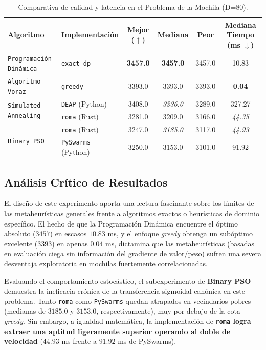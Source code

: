 \documentclass[12pt,a4paper,twoside,openright]{book}
\begin{document}
\begin{table}[htbp]
\centering
\small
\begin{tabular}{l l ccc c}
\toprule
\textbf{Algoritmo} & \textbf{Implementación} & \textbf{Mejor ($\uparrow$)} & \textbf{Mediana} & \textbf{Peor} & \textbf{Mediana Tiempo (ms $\downarrow$)} \\
\midrule
\texttt{Programación Dinámica}& \texttt{exact\_dp} & \textbf{3457.0} & \textbf{3457.0} & 3457.0 & 10.83 \\
\texttt{Algoritmo Voraz} & \texttt{greedy} & 3393.0 & 3393.0 & 3393.0 & \textbf{0.04} \\
\midrule
\multirow{2}{*}{\texttt{Simulated Annealing}} 
& \texttt{DEAP} (Python) & 3408.0 & \textit{3336.0} & 3289.0 & 327.27 \\
& \texttt{roma} (Rust)   & 3281.0 & 3209.0 & 3166.0 & \textit{44.35} \\
\midrule
\multirow{2}{*}{\texttt{Binary PSO}} 
& \texttt{roma} (Rust)   & 3247.0 & \textit{3185.0} & 3117.0 & \textit{44.93} \\
& \texttt{PySwarms} (Python)& 3250.0 & 3153.0 & 3101.0 & 91.92 \\
\bottomrule
\end{tabular}
\caption{Comparativa de calidad y latencia en el Problema de la Mochila (D=80).}
\label{tab:resultados_knapsack}
\end{table}


\subsection{Análisis Crítico de Resultados}
    El diseño de este experimento aporta una lectura fascinante sobre los límites de las metaheurísticas generales frente a algoritmos exactos o heurísticas de dominio específico. El hecho de que la Programación Dinámica encuentre el óptimo absoluto ($3457$) en escasos $10.83$ ms, y el enfoque \textit{greedy} obtenga un subóptimo excelente ($3393$) en apenas $0.04$ ms, dictamina que las metaheurísticas (basadas en evaluación ciega sin información del gradiente de valor/peso) sufren una severa desventaja exploratoria en mochilas fuertemente correlacionadas.

    Evaluando el comportamiento estocástico, el subexperimento de \textbf{Binary PSO} demuestra la ineficacia crónica de la transferencia sigmoidal canónica en este problema. Tanto \texttt{roma} como \texttt{PySwarms} quedan atrapados en vecindarios pobres (medianas de $3185.0$ y $3153.0$, respectivamente), muy por debajo de la cota \textit{greedy}. Sin embargo, a igualdad matemática, la implementación de \textbf{\texttt{roma} logra extraer una aptitud ligeramente superior operando al doble de velocidad} ($44.93$ ms frente a $91.92$ ms de PySwarms).
\end{document}
